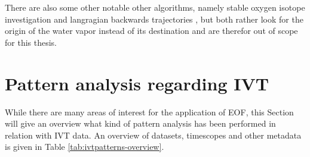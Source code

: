 There are also some other notable other algorithms, namely stable oxygen isotope investigation \cite{ma_atmospheric_nodate} and langragian backwards trajectories \cite{zhao_lagrangian_2021}, but both rather look for the origin of the  water vapor instead of its destination and are therefor out of scope for this thesis.

%
%
%
%
%
%
%
%
%
%

\section{Pattern analysis regarding IVT}
\label{sec:related_pattern_analysis}





While there are many areas of interest for the application of EOF, this Section will give an overview what kind of pattern analysis has been performed in relation with IVT data. 
An overview of datasets, timescopes and other metadata is given in Table \ref{tab:ivtpatterns-overview}.


